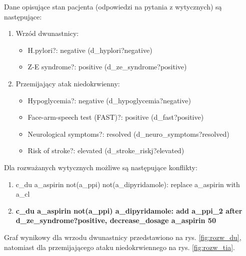 Dane opisujące stan pacjenta (odpowiedzi na pytania z wytycznych) są następujące:
\begin{enumerate}
\item{Wrzód dwunastnicy:
	\begin{itemize}
	\item{H.pylori?: negative (d\_hyplori?negative)}
	\item{Z-E syndrome?: positive (d\_ze\_syndrome?positive)}
	\end{itemize}
}
\item{Przemijający atak niedokrwienny:
	\begin{itemize}
	\item{Hypoglycemia?: negative (d\_hypoglycemia?negative)}
	\item{Face-arm-speech test (FAST)?: positive (d\_fast?positive)}
	\item{Neurological symptoms?: resolved (d\_neuro\_symptoms?resolved)}
	\item{Risk of stroke?: elevated (d\_stroke\_riskj?elevated)}
	\end{itemize}
}
\end{enumerate}
Dla rozważanych wytycznych możliwe są następujące konflikty:
\begin{enumerate}
\item c\_du a\_aspirin not(a\_ppi) not(a\_dipyridamole): replace a\_aspirin with a\_cl
\item \textbf{c\_du a\_aspirin not(a\_ppi) a\_dipyridamole: add a\_ppi\_2 after d\_ze\_syndrome?positive, decrease\_dosage a\_aspirin 50}
\end{enumerate}

Graf wynikowy dla wrzodu dwunastnicy przedstawiono na rys. \ref{fig:rozw_du}, natomiast dla przemijającego ataku niedokrwiennego na rys. \ref{fig:rozw_tia}.

